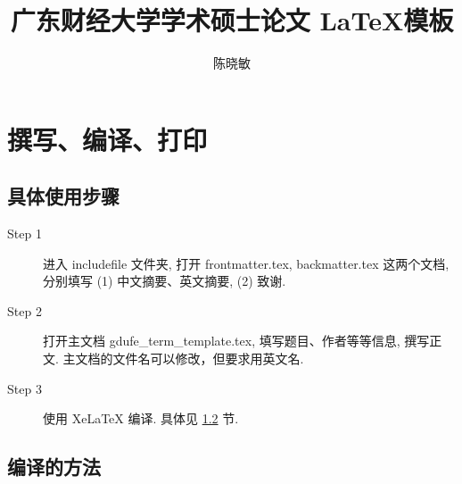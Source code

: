 \documentclass[class=academic]{gdufe_master_thesis}
\begin{document}
\title{广东财经大学学术硕士论文 \LaTeX 模板}
\author{陈晓敏}

\frontmatter
\tableofcontents
\mainmatter
\pagestyle{master-mainmatter}
\chapter{撰写、编译、打印}

\section{具体使用步骤}

\begin{description}

    \item[Step 1]  进入 includefile 文件夹,  打开 frontmatter.tex, backmatter.tex 这两个文档,
          分别填写 (1) 中文摘要、英文摘要, (2) 致谢.

    \item[Step 2]  打开主文档 gdufe\_term\_template.tex, 填写题目、作者等等信息, 撰写正文. 主文档的文件名可以修改，但要求用英文名.

    \item[Step 3]  使用 XeLaTeX 编译. 具体见 \ref{sec-compile} 节.

\end{description}

\section{编译的方法}\label{sec-compile}
\end{document}
